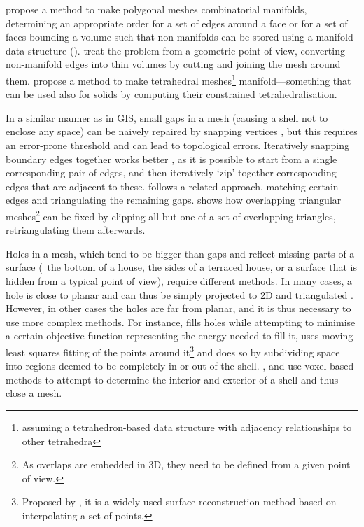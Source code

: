 \citet{Rossignac99a} propose a method to make polygonal meshes combinatorial manifolds, determining an appropriate order for a set of edges around a face or for a set of faces bounding a volume such that non-manifolds can be stored using a manifold data structure ().
\citet{Gueziec01} treat the problem from a geometric point of view, converting non-manifold edges into thin volumes by cutting and joining the mesh around them.
\citet{Attene09} propose a method to make tetrahedral meshes\footnote{assuming a tetrahedron-based data structure with adjacency relationships to other tetrahedra} manifold---something that can be used also for solids by computing their constrained tetrahedralisation.

In a similar manner as in GIS, small gaps in a mesh (causing a shell not to enclose any space) can be naively repaired by snapping vertices \citep{Rock92}, but this requires an error-prone threshold and can lead to topological errors.
Iteratively snapping boundary edges together works better \citep{Sheng95}, as it is possible to start from a single corresponding pair of edges, and then iteratively `zip' together corresponding edges that are adjacent to these.
\citet{Barequet95} follows a related approach, matching certain edges and triangulating the remaining gaps.
\citet{Turk94} shows how overlapping triangular meshes\footnote{As overlaps are embedded in 3D, they need to be defined from a given point of view.} can be fixed by clipping all but one of a set of overlapping triangles, retriangulating them afterwards.

Holes in a mesh, which tend to be bigger than gaps and reflect missing parts of a surface (\eg\ the bottom of a house, the sides of a terraced house, or a surface that is hidden from a typical point of view), require different methods.
In many cases, a hole is close to planar and can thus be simply projected to 2D and triangulated \citep{Bohn92}.
However, in other cases the holes are far from planar, and it is thus necessary to use more complex methods.
For instance, \citet{Levy03} fills holes while attempting to minimise a certain objective function representing the energy needed to fill it, \citet{Wang07} uses moving least squares fitting of the points around it\footnote{Proposed by \citet{Lancaster81}, it is a widely used surface reconstruction method based on interpolating a set of points.} and \citet{Podolak05} does so by subdividing space into regions deemed to be completely in or out of the shell.
\citet{Nooruddin03}, \citet{Bischoff05} and \citet{Hetroy11} use voxel-based methods to attempt to determine the interior and exterior of a shell and thus close a mesh.


